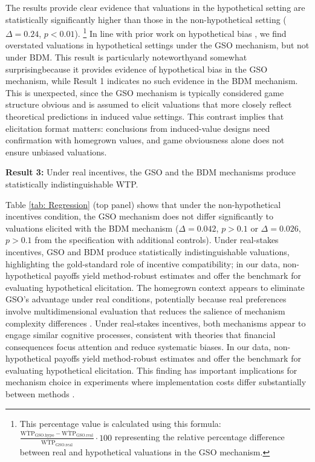 \documentclass[12pt]{article}
\begin{document}
The results provide clear evidence that valuations in the hypothetical setting are statistically significantly higher than those in the non-hypothetical setting (\(\Delta = 0.24\), \(p < 0.01\)). \footnote{This percentage value is calculated using this formula: \(\frac{\overline{\mathrm{WTP}}_{\mathrm{GSO.hypo}}-\overline{\mathrm{WTP}}_{\mathrm{GSO.real}}}{\overline{\mathrm{WTP}}_{\mathrm{GSO.real}}}\cdot 100\) representing the relative percentage difference between real and hypothetical valuations in the GSO mechanism.}
In line with prior work on hypothetical bias \citep{penn2018understanding, fang_use_2021, ahles_testing_2024}, we find overstated valuations in hypothetical settings under the GSO mechanism, but not under BDM.  
This result is particularly noteworthy\textemdash and somewhat surprising\textemdash because it provides evidence of hypothetical bias in the GSO mechanism, while Result 1 indicates no such evidence in the BDM mechanism. This is unexpected, since the GSO mechanism is typically considered  game structure obvious  and is assumed to elicit valuations that more closely reflect theoretical predictions in induced value settings. This contrast implies that elicitation format matters: conclusions from induced-value designs need confirmation with homegrown values, and game obviousness alone does not ensure unbiased valuations.




\vspace{0.5cm}



\textbf{Result 3:} Under real incentives, the GSO and the BDM mechanisms produce statistically indistinguishable WTP. 

Table \ref{tab: Regression} (top panel) shows that under the non-hypothetical incentives condition, the GSO mechanism does not differ significantly to valuations elicited with the BDM mechanism (\(\Delta = 0.042\), \(p > 0.1\) or \(\Delta = 0.026\), \(p > 0.1\) from the specification with additional controls). Under real-stakes incentives, GSO and BDM produce statistically indistinguishable valuations, highlighting the gold-standard role of incentive compatibility; in our data, non-hypothetical payoffs yield method-robust estimates and offer the benchmark for evaluating hypothetical elicitation. The homegrown context appears to eliminate GSO's advantage under real conditions, potentially because real preferences involve multidimensional evaluation that reduces the salience of mechanism complexity differences \citep{drichoutis2022game}. Under real-stakes incentives, both mechanisms appear to engage similar cognitive processes, consistent with theories that financial consequences focus attention and reduce systematic biases. In our data, non-hypothetical payoffs yield method-robust estimates and offer the benchmark for evaluating hypothetical elicitation. This finding has important implications for mechanism choice in experiments where implementation costs differ substantially between methods \citep{list2011so}. 
\end{document}
